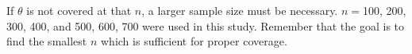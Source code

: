 \documentclass[12pt, letterpaper, titlepage]{article}
\begin{document}
If $\theta$ is not covered at that $n$, a larger sample size must be necessary. $n = $100, 200, 300, 400, and 500, 600, 700 were used in this study. 
Remember that the goal is to find the smallest $n$ which is sufficient for proper coverage. 

\end{document}
